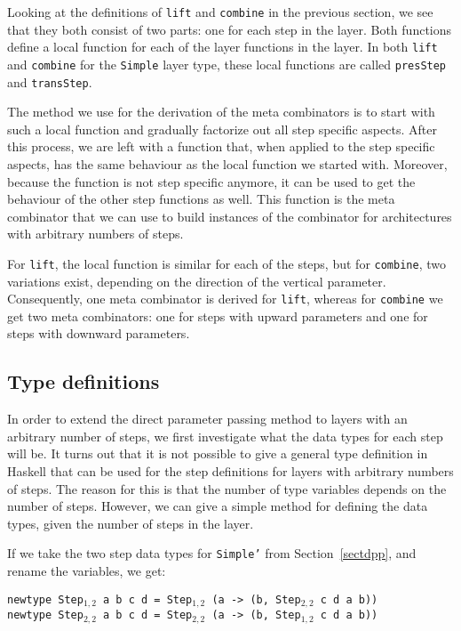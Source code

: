 Looking at the definitions of \texttt{lift} and \texttt{combine} in the previous section, we see that they both consist of two parts: one for each step in the layer. Both functions define a local function for each of the layer functions in the layer. In both \texttt{lift} and \texttt{combine} for the \texttt{Simple} layer type, these local functions are called \texttt{presStep} and \texttt{transStep}. 

The method we use for the derivation of the meta combinators is to start with such a local function and gradually factorize out all step specific aspects. After this process, we are left with a function that, when applied to the step specific aspects, has the same behaviour as the local function we started with. Moreover, because the function is not step specific anymore, it can be used to get the behaviour of the other step functions as well. This function is the meta combinator that we can use to build instances of the combinator for architectures with arbitrary numbers of steps.

 For \texttt{lift}, the local function is similar for each of the steps, but for \texttt{combine}, two variations exist, depending on the direction of the vertical parameter. Consequently, one meta combinator is derived for \texttt{lift}, whereas for \texttt{combine} we get two meta combinators: one for steps with upward parameters and one for steps with downward parameters.
 
 
%																
\subsection{Type definitions} \label{subsecttypedef}

In order to extend the direct parameter passing method to layers with an arbitrary number of steps, we first investigate what the data types for each step will be. It turns out that it is not possible to give a general type definition in Haskell that can be used for the step definitions for layers with arbitrary numbers of steps. The reason for this is that the number of type variables depends on the number of steps. However, we can give a simple method for defining the data types, given the number of steps in the layer.

If we take the two step data types for \texttt{Simple'} from Section~\ref{sectdpp}, and rename the variables, we get:

{\tt newtype Step$_{1,2}$ a b c d = Step$_{1,2}$ (a -> (b, Step$_{2,2}$ c d a b))}\\
{\tt newtype Step$_{2,2}$ a b c d = Step$_{2,2}$ (a -> (b, Step$_{1,2}$ c d a b))}

